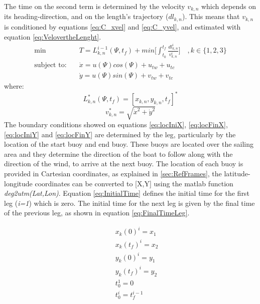 The time on the second term is determined by the velocity $v_{k,n}$ which depends on its heading-direction, and on the length's trajectory ($dl_{k,n}$). This means that $v_{k,n}$ is  conditioned by equations \ref{eq:C_xvel} and \ref{eq:C_yvel}, and estimated with equation \ref{eq:VelovertheLenght}.
\begin{align}
    \text{min } & T=
    L_{k,n}^{i-1}(\Psi,t_{f})+ min \bigg[ \int_{t_{0}}^{t_{f}}  \frac{dl_{k,n}^i}{v_{k,n}^i} \bigg] \quad ,k \in \{1,2,3\} \label{eq:minTO}\\
\text{subject to:} \quad & \Dot{x}=u(\Psi)cos(\Psi) + u_{tw}+u_{tc} \label{eq:C_xvel} \\
\quad & \Dot{y}=u(\Psi)sin(\Psi) + v_{tw}+v_{tc} \label{eq:C_yvel}
\end{align}
where:
\begin{equation}\label{eq:CollectPointsTime}
     L_{k,n}^{*}(\Psi,t_{f})=[x_{k,n}, y_{k,n},t_{f}]^{*}
\end{equation}
\begin{equation}\label{eq:VelovertheLenght}
     v_{k,n}^{*}=\sqrt{\Dot{x}^2+\Dot{y}^2}
\end{equation}
The boundary conditions showed on equations \ref{eq:locIniX}, \ref{eq:locFinX}, \ref{eq:locIniY} and \ref{eq:locFinY} are determined by the leg, particularly by the location of the start buoy and end buoy. These buoys are located over the sailing area and they determine the direction of the boat to follow along with the direction of the wind, to arrive at the next buoy. The location of each buoy is provided in Cartesian coordinates, as explained in \ref{sec:RefFrames}, the latitude-longitude coordinates can be converted to [X,Y] using the \acrshort{matlab} function \textit{deg2utm(Lat,Lon)}. Equation \ref{eq:InitialTime} defines the initial time for the first leg (\textit{i=1}) which is zero. The initial time for the next leg is given by the final time of the previous leg, as shown in equation \ref{eq:FinalTimeLeg}.\par 
\begin{align}
    \quad & x_{k}(0)^i=x_{1}\label{eq:locIniX} \\
    \quad & x_{k}(t_{f})^i=x_{2}\label{eq:locFinX} \\
    \quad & y_{k}(0)^i=y_{1}\label{eq:locIniY} \\
    \quad & y_{k}(t_{f})^i=y_{2}\label{eq:locFinY}\\
    \quad & t_{0}^1=0 \label{eq:InitialTime} \\
    \quad & t_{0}^{i}= t_{f}^{i-1} \label{eq:FinalTimeLeg}
\end{align}
